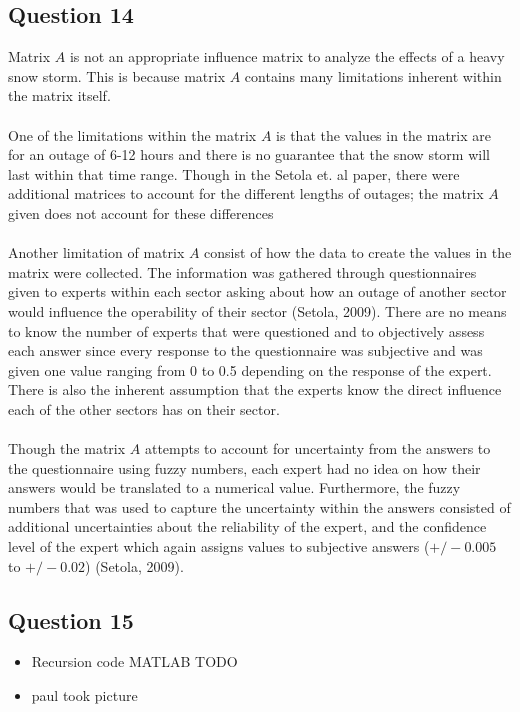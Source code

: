 \documentclass[11pt,a4paper]{article}
\begin{document}
\subsection*{Question 14}
Matrix $A$ is not an appropriate influence matrix to analyze the effects of a heavy snow storm. This is because matrix $A$ contains many limitations inherent within the matrix itself.\\
\\
One of the limitations within the matrix $A$ is that the values in the matrix are for an outage of 6-12 hours and there is no guarantee that the snow storm will last within that time range. Though in the Setola et. al paper, there were additional matrices to account for the different lengths of outages; the matrix $A$ given does not account for these differences\\
\\
Another limitation of matrix $A$ consist of how the data to create the values in the matrix were collected. The information was gathered through questionnaires given to experts within each sector asking about how an outage of another sector would influence the operability of their sector (Setola, 2009). There are no means to know the number of experts that were questioned and to objectively assess each answer since every response to the questionnaire was subjective and was given one value ranging from 0 to 0.5 depending on the response of the expert. There is also the inherent assumption that the experts know the direct influence each of the other sectors has on their sector.\\
\\
Though the matrix $A$ attempts to account for uncertainty from the answers to the questionnaire using fuzzy numbers, each expert had no idea on how their answers would be translated to a numerical value. Furthermore, the fuzzy numbers that was used to capture the uncertainty within the answers consisted of additional uncertainties about the reliability of the expert, and the confidence level of the expert which again assigns values to subjective answers ($+/-0.005$ to $+/-0.02$) (Setola, 2009).

\subsection*{Question 15}
\begin{itemize}
	\item Recursion code MATLAB TODO
	\item paul took picture
\end{itemize}
\end{document}
